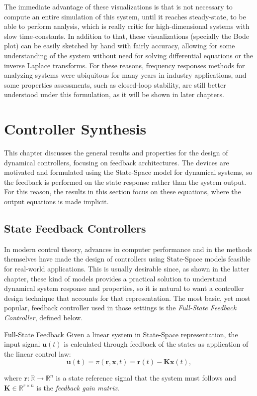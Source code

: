 \documentclass[a4paper,11pt]{book}
\numberwithin{figure}{chapter}
\numberwithin{equation}{chapter}
\numberwithin{table}{chapter}
\theoremstyle{definition}
\newtheorem{definition}{Definition}[chapter]
\newcounter{boxed-theorem}
\newcounter{boxed-definition}
\newenvironment{boxed-definition}[1]
{\colorlet{shadecolor}{pastelYellow!15} \begin{shaded} \begin{definition}{#1}}
{\end{definition} \end{shaded}}
\newcounter{boxed-example}
\begin{document}
The immediate advantage of these visualizations is that is not necessary to compute an entire simulation of this system, until it reaches steady-state, to be able to perform analysis, which is really critic for high-dimensional systems with slow time-constants. In addition to that, these visualizations (specially the Bode plot) can be easily sketched by hand with fairly accuracy, allowing for some understanding of the system without need for solving differential equations or the inverse Laplace transforms. For these reasons, frequency responses methods for analyzing systems were ubiquitous for many years in industry applications, and some properties assessments, such as closed-loop stability, are still better understood under this formulation, as it will be shown in later chapters.

\clearpage
\chapter{Controller Synthesis}

This chapter discusses the general results and properties for the design of dynamical controllers, focusing on feedback architectures. The devices are motivated and formulated using the State-Space model for dynamical systems, so the feedback is performed on the state response rather than the system output. For this reason, the results in this section focus on these equations, where the output equations is made implicit.

\section{State Feedback Controllers}

In modern control theory, advances in computer performance and in the methods themselves have made the design of controllers using State-Space models feasible for real-world applications. This is usually desirable since, as shown in the latter chapter, these kind of models provides a practical solution to understand dynamical system response and properties, so it is natural to want a controller design technique that accounts for that representation. The most basic, yet most popular, feedback controller used in those settings is the \textit{Full-State Feedback Controller}, defined below. 

\begin{boxed-definition}{Full-State Feedback}
    Given a linear system in State-Space representation, the input signal $\bm{u}(t)$ is calculated through feedback of the states as application of the linear control law:
    \begin{equation}
        \bm{u(t)} = \pi(\bm{r}, \bm{x}, t) = \bm{r}(t) - \bm{K} \bm{x}(t)
    ,\end{equation}
    
    \noindent where $\bm{r} : \mathbb{R} \rightarrow \mathbb{R}^{n}$ is a state reference signal that the system must follows and $\bm{K} \in \mathbb{R}^{r \times n}$ is the \textit{feedback gain matrix}.
\end{boxed-definition}
\end{document}
